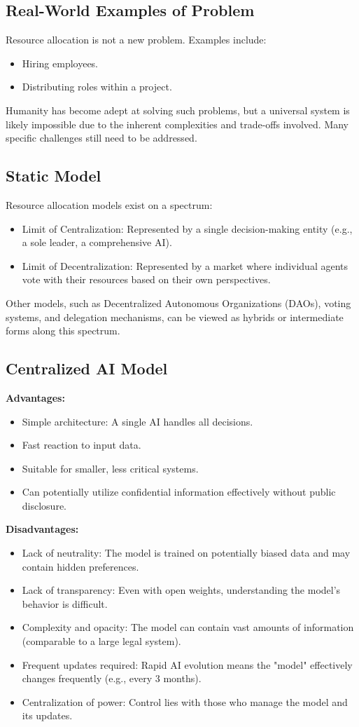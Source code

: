 \documentclass[12pt]{article}
\begin{document}
\subsection{Real-World Examples of Problem}
Resource allocation is not a new problem. Examples include:
\begin{itemize}
    \item Hiring employees.
    \item Distributing roles within a project.
\end{itemize}
Humanity has become adept at solving such problems, but a universal system is likely impossible due to the inherent complexities and trade-offs involved. Many specific challenges still need to be addressed.

\subsection{Static Model}
Resource allocation models exist on a spectrum:
\begin{itemize}
  \item Limit of Centralization: Represented by a single decision-making entity (e.g., a sole leader, a comprehensive AI).
  \item Limit of Decentralization: Represented by a market where individual agents vote with their resources based on their own perspectives.
\end{itemize}
Other models, such as Decentralized Autonomous Organizations (DAOs), voting systems, and delegation mechanisms, can be viewed as hybrids or intermediate forms along this spectrum.

\subsection{Centralized AI Model}
\textbf{Advantages:}
\begin{itemize}
  \item Simple architecture: A single AI handles all decisions.
  \item Fast reaction to input data.
  \item Suitable for smaller, less critical systems.
  \item Can potentially utilize confidential information effectively without public disclosure.
\end{itemize}
\textbf{Disadvantages:}
\begin{itemize}
  \item Lack of neutrality: The model is trained on potentially biased data and may contain hidden preferences.
  \item Lack of transparency: Even with open weights, understanding the model's behavior is difficult.
  \item Complexity and opacity: The model can contain vast amounts of information (comparable to a large legal system).
  \item Frequent updates required: Rapid AI evolution means the "model" effectively changes frequently (e.g., every 3 months).
  \item Centralization of power: Control lies with those who manage the model and its updates.
\end{itemize}
\end{document}
